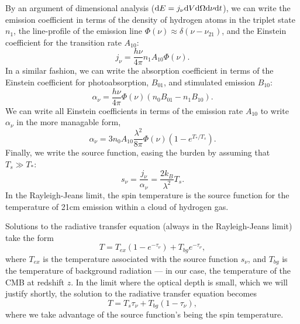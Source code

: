 By an argument of dimensional analysis (${\rm d}E = j_\nu{\rm d}V{\rm d}\Omega{\rm d}\nu{\rm d}t$),
we can write the emission coefficient in terms of the density of hydrogen atoms in the triplet state
$n_1$, the line-profile of the emission line $\Phi(\nu) \approx \delta(\nu-\nu_{21})$, and the
Einstein coefficient for the transition rate $A_{10}$:
\begin{equation}
  j_\nu = \frac{h\nu}{4\pi}n_1A_{10}\Phi(\nu).
  \label{eq:jnu}
\end{equation}
In a similar fashion, we can write the absorption coefficient in terms of the Einstein coefficient
for photoabsorption, $B_{01}$, and stimulated emission $B_{10}$:
\begin{equation}
  \alpha_\nu = \frac{h\nu}{4\pi}\Phi(\nu)(n_0B_{01} - n_1B_{10}).
\end{equation}
We can write all Einstein coefficients in terms of the emission rate $A_{10}$ to write 
$\alpha_\nu$ in the more managable form,
\begin{equation}
  \alpha_\nu = 
  3n_0A_{10}\frac{\lambda^2}{8\pi}\Phi(\nu)\left(1-e^{T_*/T_s}\right).
\end{equation}
Finally, we write the source function, easing the burden by assuming that $T_s \gg T_*$:
\begin{equation}
  s_\nu = \frac{j_\nu}{\alpha_\nu}
  = \frac{2k_B}{\lambda^2}T_s.
  \label{eq:source_function}
\end{equation}
In the Rayleigh-Jeans limit, the spin temperature is the source function for the temperature of 21cm
emission within a cloud of hydrogen gas.

Solutions to the radiative transfer equation (always in the Rayleigh-Jeans limit) take the form
\begin{equation}
  T = T_{ex}(1-e^{-\tau_\nu}) + T_{bg}e^{-\tau_\nu},
\end{equation}
where $T_{ex}$ is the temperature associated with the source function $s_\nu$, and $T_{bg}$ is the
temperature of background radiation --- in our case, the temperature of the CMB at redshift $z$. In the limit
where the optical depth is small, which we will justify shortly, the solution to the radiative transfer equation
becomes
\begin{equation}
  T = T_s\tau_\nu + T_{bg}(1-\tau_\nu),
  \label{eq:RTE_tau}
\end{equation}
where we take advantage of the source function's being the spin temperature.

